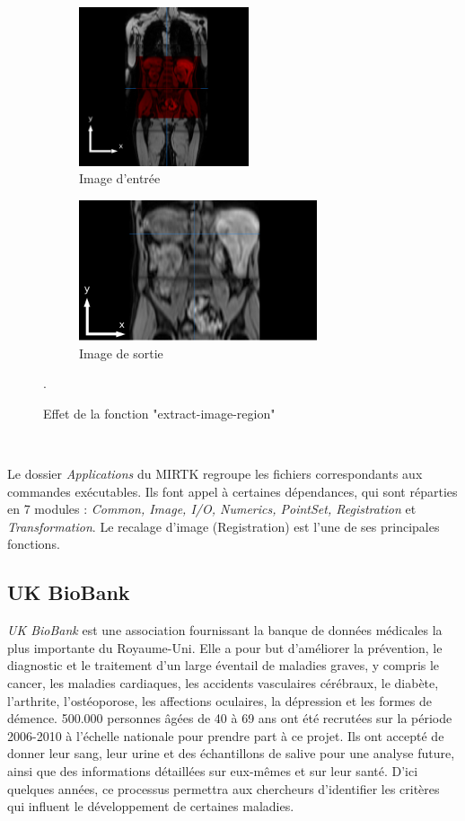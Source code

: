 \documentclass[10pt]{report}
\begin{document}
	\begin{figure}[h!]
		\centering
		\begin{subfigure}{.5\textwidth}
			\centering
			\includegraphics[width=5cm]{Reports/figures/mirtkextractregion1dbis.png}
			\caption{Image d'entrée}
			\label{Image d'entrée}
		\end{subfigure}%
		\begin{subfigure}{.5\textwidth}
			\centering
			\includegraphics[width=7cm]{Reports/figures/mirtkextractregion21d.png}
			\caption{Image de sortie}
			\label{Image de sortie}
		\end{subfigure}
		\caption{Effet de la fonction "extract-image-region"}.
		\label{Effet de la fonction "extract-image-region"}
	\end{figure}~\par
	
	Le dossier \textit{Applications} du MIRTK regroupe les fichiers correspondants aux commandes exécutables. Ils font appel à certaines dépendances, qui sont réparties en 7 modules : \textit{Common, Image, I/O, Numerics, PointSet, Registration} et \textit{Transformation}. 
	 Le recalage d'image (Registration) est l'une de ses principales fonctions.
	
	 \subsection{UK BioBank}

	 \textit{UK BioBank} est une association fournissant la banque de données médicales la plus importante du Royaume-Uni. Elle a pour but d'améliorer la prévention, le diagnostic et le traitement d'un large éventail de maladies graves, y compris le cancer, les maladies cardiaques, les accidents vasculaires cérébraux, le diabète, l'arthrite, l'ostéoporose, les affections oculaires, la dépression et les formes de démence. 500.000 personnes âgées de 40 à 69 ans ont été recrutées sur la période 2006-2010 à l'échelle nationale pour prendre part à ce projet. Ils ont accepté de donner leur sang, leur urine et des échantillons de salive pour une analyse future, ainsi que des informations détaillées sur eux-mêmes et sur leur santé. D'ici quelques années, ce processus permettra aux chercheurs d'identifier les critères qui influent le développement de certaines maladies.
	 
\end{document}
